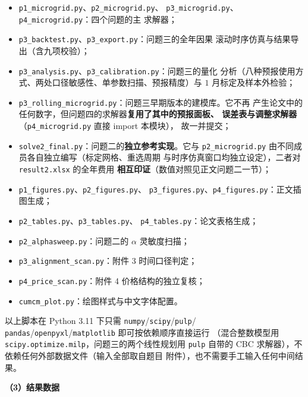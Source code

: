 \documentclass[withoutpreface,bwprint]{cumcmthesis}
\begin{document}
\begin{appendices}
\begin{itemize}
  \item \texttt{p1\_microgrid.py}、\texttt{p2\_microgrid.py}、
        \texttt{p3\_microgrid.py}、\texttt{p4\_microgrid.py}：四个问题的主
        求解器；
  \item \texttt{p3\_backtest.py}、\texttt{p3\_export.py}：问题三的全年因果
        滚动时序仿真与结果导出（含九项校验）；
  \item \texttt{p3\_analysis.py}、\texttt{p3\_calibration.py}：问题三的量化
        分析（八种预报使用方式、两处口径敏感性、单参数扫描、预报精度）与
        $1$ 月标定及样本外检验；
  \item \texttt{p3\_rolling\_microgrid.py}：问题三早期版本的建模库。它不再
        产生论文中的任何数字，但问题四的求解器\textbf{复用了其中的预报面板、
        误差表与调整求解器}（\texttt{p4\_microgrid.py} 直接 import 本模块），
        故一并提交；
  \item \texttt{solve2\_final.py}：问题二的\textbf{独立参考实现}。它与
        \texttt{p2\_microgrid.py} 由不同成员各自独立编写（标定网格、重选周期
        与时序仿真窗口均独立设定），二者对 \texttt{result2.xlsx} 的全年费用
        \textbf{相互印证}（数值对照见正文问题二一节）；
  \item \texttt{p1\_figures.py}、\texttt{p2\_figures.py}、
        \texttt{p3\_figures.py}、\texttt{p4\_figures.py}：正文插图生成；
  \item \texttt{p2\_tables.py}、\texttt{p3\_tables.py}、
        \texttt{p4\_tables.py}：论文表格生成；
  \item \texttt{p2\_alphasweep.py}：问题二的 $\alpha$ 灵敏度扫描；
  \item \texttt{p3\_alignment\_scan.py}：附件 3 时间口径判定；
  \item \texttt{p4\_price\_scan.py}：附件 4 价格结构的独立复核；
  \item \texttt{cumcm\_plot.py}：绘图样式与中文字体配置。
\end{itemize}

以上脚本在 Python 3.11 下只需 \texttt{numpy}/\texttt{scipy}/\texttt{pulp}/
\texttt{pandas}/\texttt{openpyxl}/\texttt{matplotlib} 即可按依赖顺序直接运行
（混合整数模型用 \texttt{scipy.optimize.milp}，问题三的两个线性规划用
\texttt{pulp} 自带的 CBC 求解器），不依赖任何外部数据文件（输入全部取自题目
附件），也不需要手工输入任何中间结果。

\textbf{（3）结果数据}


\end{appendices}
\end{document}
